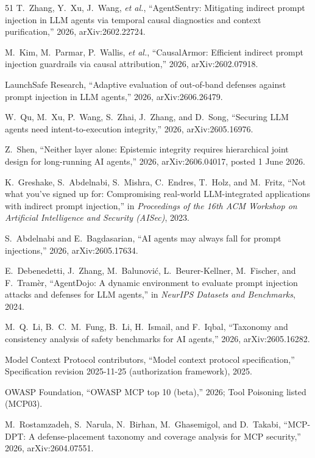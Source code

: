 \documentclass[conference,compsoc]{IEEEtran}
\theoremstyle{definition}
\theoremstyle{plain}
\begin{document}
\begin{thebibliography}{51}
 T.~Zhang, Y.~Xu, J.~Wang, \emph{et al.},
``AgentSentry: Mitigating indirect prompt injection in LLM agents
via temporal causal diagnostics and context purification,'' 2026,
arXiv:2602.22724.

 M.~Kim, M.~Parmar, P.~Wallis, \emph{et al.},
``CausalArmor: Efficient indirect prompt injection guardrails via
causal attribution,'' 2026, arXiv:2602.07918.

 LaunchSafe Research, ``Adaptive evaluation of
out-of-band defenses against prompt injection in LLM agents,''
2026, arXiv:2606.26479.

 W.~Qu, M.~Xu, P.~Wang, S.~Zhai, J.~Zhang, and
D.~Song, ``Securing LLM agents need intent-to-execution
integrity,'' 2026, arXiv:2605.16976.

 Z.~Shen, ``Neither layer alone: Epistemic integrity
requires hierarchical joint design for long-running AI agents,''
2026, arXiv:2606.04017, posted 1 June 2026.

 K.~Greshake, S.~Abdelnabi, S.~Mishra,
C.~Endres, T.~Holz, and M.~Fritz, ``Not what you've signed up
for: Compromising real-world LLM-integrated applications with
indirect prompt injection,'' in \emph{Proceedings of the 16th ACM
Workshop on Artificial Intelligence and Security (AISec)}, 2023.

 S.~Abdelnabi and E.~Bagdasarian, ``AI agents
may always fall for prompt injections,'' 2026, arXiv:2605.17634.

 E.~Debenedetti, J.~Zhang, M.~Balunovi\'c,
L.~Beurer-Kellner, M.~Fischer, and F.~Tram\`er, ``AgentDojo: A
dynamic environment to evaluate prompt injection attacks and
defenses for LLM agents,'' in \emph{NeurIPS Datasets and
Benchmarks}, 2024.

 M.~Q.~Li, B.~C.~M.~Fung, B.~Li, H.~Ismail, and
F.~Iqbal, ``Taxonomy and consistency analysis of
safety benchmarks for AI agents,'' 2026, arXiv:2605.16282.

 Model Context Protocol contributors, ``Model
context protocol specification,'' Specification revision
2025-11-25 (authorization framework), 2025.

 OWASP Foundation, ``OWASP MCP top 10 (beta),''
2026; Tool Poisoning listed (MCP03).

 M.~Rostamzadeh, S.~Narula, N.~Birhan,
M.~Ghasemigol, and D.~Takabi, ``MCP-DPT: A defense-placement taxonomy
and coverage analysis for MCP security,'' 2026,
arXiv:2604.07551.


\end{thebibliography}
\end{document}
